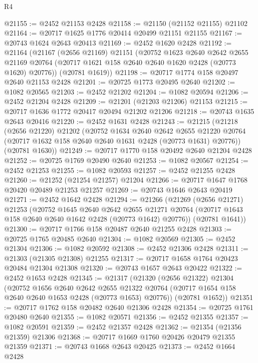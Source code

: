 \begin{lexlean}{R4}
\begin{coremodule}
@21155 := @2452 @21153 @2428
@21158 := @21150 (@21152 @21155) @21102
@21164 := @20717 @1625 @1776 @20414 @20499 @21151 @21155
@21167 := @20743 @1624 @2643 @20413
@21169 := @2452 @1620 @2428
@21192 := @21164
    (@21167
      (@2656 @21169)
      @21151
      (@20752
        @1623
        @2640
        @2642
        @2655
        @21169
        @20764
        (@20717 @1621 @158 @2640 @2640 @1620 @2428 (@20773 @1620) @20776))
      (@20781 @1619))
@21198 := @20717 @1774 @158 @20497 @2640 @21153 @2428
@21201 := @20725 @1773 @20495 @2640
@21202 := @1082 @20565
@21203 := @2452 @21202
@21204 := @1082 @20594
@21206 := @2452 @21204 @2428
@21209 := @21201 (@21203 @21206) @21153
@21215 := @20717 @1636 @1772 @20417 @20494 @21202 @21206
@21218 := @20743 @1635 @2643 @20416
@21220 := @2452 @1631 @2428
@21243 := @21215
    (@21218
      (@2656 @21220)
      @21202
      (@20752
        @1634
        @2640
        @2642
        @2655
        @21220
        @20764
        (@20717 @1632 @158 @2640 @2640 @1631 @2428 (@20773 @1631) @20776))
      (@20781 @1630))
@21249 := @20717 @1770 @158 @20492 @2640 @21204 @2428
@21252 := @20725 @1769 @20490 @2640
@21253 := @1082 @20567
@21254 := @2452 @21253
@21255 := @1082 @20593
@21257 := @2452 @21255 @2428
@21260 := @21252 (@21254 @21257) @21204
@21266 := @20717 @1647 @1768 @20420 @20489 @21253 @21257
@21269 := @20743 @1646 @2643 @20419
@21271 := @2452 @1642 @2428
@21294 := @21266
    (@21269
      (@2656 @21271)
      @21253
      (@20752
        @1645
        @2640
        @2642
        @2655
        @21271
        @20764
        (@20717 @1643 @158 @2640 @2640 @1642 @2428 (@20773 @1642) @20776))
      (@20781 @1641))
@21300 := @20717 @1766 @158 @20487 @2640 @21255 @2428
@21303 := @20725 @1765 @20485 @2640
@21304 := @1082 @20569
@21305 := @2452 @21304
@21306 := @1082 @20592
@21308 := @2452 @21306 @2428
@21311 := @21303 (@21305 @21308) @21255
@21317 := @20717 @1658 @1764 @20423 @20484 @21304 @21308
@21320 := @20743 @1657 @2643 @20422
@21322 := @2452 @1653 @2428
@21345 := @21317
    (@21320
      (@2656 @21322)
      @21304
      (@20752
        @1656
        @2640
        @2642
        @2655
        @21322
        @20764
        (@20717 @1654 @158 @2640 @2640 @1653 @2428 (@20773 @1653) @20776))
      (@20781 @1652))
@21351 := @20717 @1762 @158 @20482 @2640 @21306 @2428
@21354 := @20725 @1761 @20480 @2640
@21355 := @1082 @20571
@21356 := @2452 @21355
@21357 := @1082 @20591
@21359 := @2452 @21357 @2428
@21362 := @21354 (@21356 @21359) @21306
@21368 := @20717 @1669 @1760 @20426 @20479 @21355 @21359
@21371 := @20743 @1668 @2643 @20425
@21373 := @2452 @1664 @2428

\end{coremodule}
\end{lexlean}
